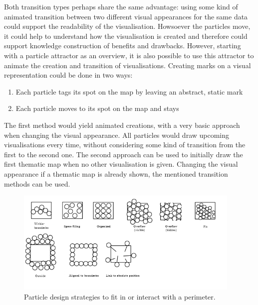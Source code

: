 Both transition types perhaps share the same advantage: using some kind of animated transition between two different visual appearances for the same data could support the readability of the visualisation. Howsoever the particles move, it could help to understand how the visualisation is created and therefore could support knowledge construction of benefits and drawbacks.
However, starting with a particle attractor as an overview, it is also possible to use this attractor to animate the creation and transition of visualisations. Creating marks on a visual representation could be done in two ways:

\begin{enumerate}
\item Each particle tags its spot on the map by leaving an abstract, static mark
\item Each particle moves to its spot on the map and stays
\end{enumerate}

The first method would yield animated creations, with a very basic approach when changing the visual appearance. All particles would draw upcoming visualisations every time, without considering some kind of transition from the first to the second one. The second approach can be used to initially draw the first thematic map when no other visualisation is given. Changing the visual appearance if a thematic map is already shown, the mentioned transition methods can be used.

\begin{figure}[!htb]
\centering
\includegraphics[height=5cm]{images/methods/related/strategies.png}
\caption[
    Particle design strategies to fit in or interact with a perimeter.
]{Particle design strategies to fit in or interact with a perimeter.}
\label{fig:particle-design-strategies}
\end{figure}

